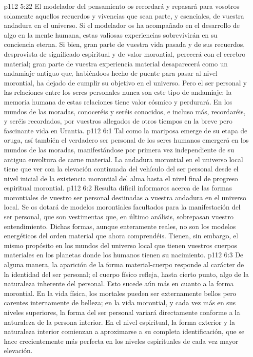 \vs p112 5:22 El modelador del pensamiento os recordará y repasará para vosotros solamente aquellos recuerdos y vivencias que sean parte, y esenciales, de vuestra andadura en el universo. Si el modelador os ha acompañado en el desarrollo de algo en la mente humana, estas valiosas experiencias sobrevivirán en su conciencia eterna. Si bien, gran parte de vuestra vida pasada y de sus recuerdos, desprovista de significado espiritual y de valor morontial, perecerá con el cerebro material; gran parte de vuestra experiencia material desaparecerá como un andamiaje antiguo que, habiéndoos hecho de puente para pasar al nivel morontial, ha dejado de cumplir su objetivo en el universo. Pero el ser personal y las relaciones entre los seres personales nunca son este tipo de andamiaje; la memoria humana de estas relaciones tiene valor cósmico y perdurará. En los mundos de las moradas, conoceréis y seréis conocidos, e incluso más, recordaréis, y seréis recordados, por vuestros allegados de otros tiempos en la breve pero fascinante vida en Urantia.
\vs p112 6:1 Tal como la mariposa emerge de su etapa de oruga, así también el verdadero ser personal de los seres humanos emergerá en los mundos de las moradas, manifestándose por primera vez independiente de su antigua envoltura de carne material. La andadura morontial en el universo local tiene que ver con la elevación continuada del vehículo del ser personal desde el nivel inicial de la existencia morontial del alma hasta el nivel final de progreso espiritual morontial.
\vs p112 6:2 Resulta difícil informaros acerca de las formas morontiales de vuestro ser personal destinadas a vuestra andadura en el universo local. Se os dotará de modelos morontiales facultados para la manifestación del ser personal, que son vestimentas que, en último análisis, sobrepasan vuestro entendimiento. Dichas formas, aunque enteramente reales, no son los modelos energéticos del orden material que ahora comprendéis. Tienen, sin embargo, el mismo propósito en los mundos del universo local que tienen vuestros cuerpos materiales en los planetas donde los humanos tienen su nacimiento.
\vs p112 6:3 De alguna manera, la aparición de la forma material\hyp{}cuerpo responde al carácter de la identidad del ser personal; el cuerpo físico refleja, hasta cierto punto, algo de la naturaleza inherente del personal. Esto sucede aún más en cuanto a la forma morontial. En la vida física, los mortales pueden ser externamente bellos pero carentes internamente de belleza; en la vida morontial, y cada vez más en sus niveles superiores, la forma del ser personal variará directamente conforme a la naturaleza de la persona interior. En el nivel espiritual, la forma exterior y la naturaleza interior comienzan a aproximarse a su completa identificación, que se hace crecientemente más perfecta en los niveles espirituales de cada vez mayor elevación.
